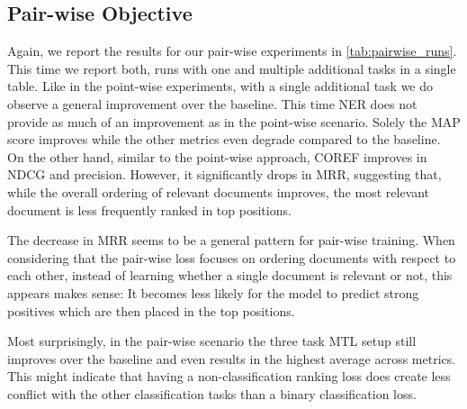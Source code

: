\subsection{Pair-wise Objective}
Again, we report the results for our pair-wise experiments in \autoref{tab:pairwise_runs}. This time we report both, runs with one and multiple additional tasks in a single table. Like in the point-wise experiments, with a single additional task we do observe a general improvement over the baseline. This time NER does not provide as much of an improvement as in the point-wise scenario. Solely the MAP score improves while the other metrics even degrade compared to the baseline. On the other hand, similar to the point-wise approach, COREF improves in NDCG and precision. However, it significantly drops in MRR, suggesting that, while the overall ordering of relevant documents improves, the most relevant document is less frequently ranked in top positions.

The decrease in MRR seems to be a general pattern for pair-wise training. When considering that the pair-wise loss focuses on ordering documents with respect to each other, instead of learning whether a single document is relevant or not, this appears makes sense: It becomes less likely for the model to predict strong positives which are then placed in the top positions.

Most surprisingly, in the pair-wise scenario the three task MTL setup still improves over the baseline and even results in the highest average across metrics. This might indicate that having a non-classification ranking loss does create less conflict with the other classification tasks than a binary classification loss.


